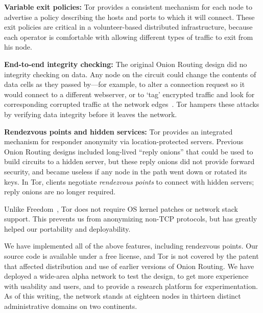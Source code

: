 \documentclass[twocolumn]{article}
\begin{document}
\textbf{Variable exit policies:} Tor provides a consistent mechanism
for each node to advertise a policy describing the hosts
and ports to which it will connect. These exit policies are critical
in a volunteer-based distributed infrastructure, because each operator
is comfortable with allowing different types of traffic to exit
from his node.

\textbf{End-to-end integrity checking:} The original Onion Routing
design did no integrity checking on data. Any node on the
circuit could change the contents of data cells as they passed by---for
example, to alter a connection request so it would connect
to a different webserver, or to `tag' encrypted traffic and look for
corresponding corrupted traffic at the network edges~\cite{minion-design}.
Tor hampers these attacks by verifying data integrity before it leaves
the network.


\textbf{Rendezvous points and hidden services:}
Tor provides an integrated mechanism for responder anonymity via
location-protected servers.  Previous Onion Routing designs included
long-lived ``reply onions'' that could be used to build circuits
to a hidden server, but these reply onions did not provide forward
security, and became useless if any node in the path went down
or rotated its keys.  In Tor, clients negotiate {\it rendezvous points}
to connect with hidden servers; reply onions are no longer required.

Unlike Freedom~\cite{freedom2-arch}, Tor does not require OS kernel
patches or network stack support.  This prevents us from anonymizing
non-TCP protocols, but has greatly helped our portability and
deployability.


We have implemented all of the above features, including rendezvous
points. Our source code is
available under a free license, and Tor
is not covered by the patent that affected distribution and use of
earlier versions of Onion Routing.
We have deployed a wide-area alpha network
to test the design, to get more experience with usability
and users, and to provide a research platform for experimentation.
As of this writing, the network stands at eighteen nodes in thirteen
distinct administrative domains on two continents.
\end{document}
